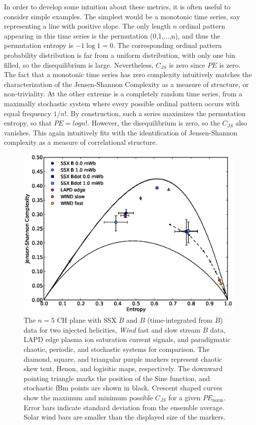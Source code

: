 \documentclass[aps,prx,twocolumn,secnumarabic,nobalancelastpage,amsmath,amssymb,
nofootinbib]{revtex4-1}
\begin{document}
In order to develop some intuition about these metrics, it is often useful to consider simple examples. The simplest would be a monotonic time series, say representing a line with positive slope. The only length $n$ ordinal pattern appearing in this time series is the permutation (0,1,...,n), and thus the permutation entropy is $-1 \log 1 =0$. The corresponding ordinal pattern probability distribution is far from a uniform distribution, with only one bin filled, so the disequilibrium is large. Nevertheless, $C_{JS}$ is zero since $PE$ is zero. The fact that a monotonic time series has zero complexity intuitively matches the characterization of the Jensen-Shannon Complexity as a measure of structure, or non-triviality. At the other extreme is a completely random time series, from a maximally stochastic system where every possible ordinal pattern occurs with equal frequency $1/n!$. By construction, such a series maximizes the permutation entropy, so that $PE=log n!$. However, the disequilibrium is zero, so the $C_{JS}$ also vanishes. This again intuitively fits with the identification of Jensen-Shannon complexity as a measure of correlational structure.
%
\begin{figure}[!htb]
\centerline{
\includegraphics[width=15cm]{figure1.eps}}
\caption{\label{fig:CHplane} The $n=5$ CH plane  with SSX $\dot{B}$ and $B$ (time-integrated from $\dot{B}$) data for two injected helicities, \textit{Wind} fast and slow stream $B$ data, LAPD edge plasma ion saturation current signals, and paradigmatic chaotic, periodic, and stochastic systems for comparison. The diamond, square, and triangular purple markers represent chaotic skew tent, Henon, and logisitic maps, respectively. The downward pointing triangle marks the position of the Sine function, and stochastic fBm points are shown in black. Crescent shaped curves show the maximum and minimum possible $C_{JS}$ for a given $PE_{\text{norm}}$. Error bars indicate standard deviation from the ensemble average. Solar wind bars are smaller than the displayed size of the markers.}
\end{figure}
%
\end{document}
